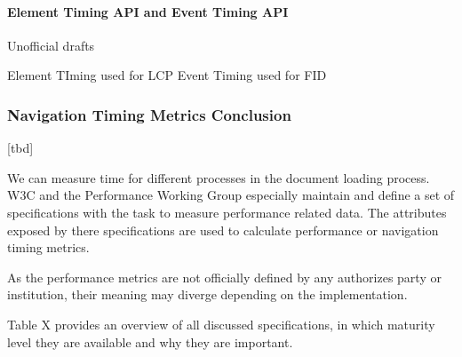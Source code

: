 


\paragraph{Element Timing API and Event Timing API}

Unofficial drafts




Element TIming used for LCP
Event Timing used for FID







\subsubsection{Navigation Timing Metrics Conclusion}

[tbd]

We can measure time for different processes in the document loading process.
W3C and the Performance Working Group especially maintain and define a set of specifications with the task to measure performance related data.
The attributes exposed by there specifications are used to calculate performance or navigation timing metrics.

As the performance metrics are not officially defined by any authorizes party or institution, their meaning may diverge depending on the implementation.

Table X provides an overview of all discussed specifications, in which maturity level they are available and why they are important.



